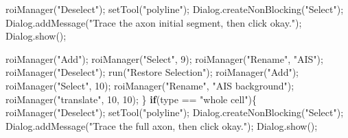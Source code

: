 \documentclass[
  12pt,
  a4paper,
]{book}
\newenvironment{Shaded}{}{}
\newcommand{\ControlFlowTok}[1]{\textcolor[rgb]{0.00,0.44,0.13}{\textbf{#1}}}
\newcommand{\DecValTok}[1]{\textcolor[rgb]{0.25,0.63,0.44}{#1}}
\newcommand{\NormalTok}[1]{#1}
\newcommand{\OperatorTok}[1]{\textcolor[rgb]{0.40,0.40,0.40}{#1}}
\newcommand{\StringTok}[1]{\textcolor[rgb]{0.25,0.44,0.63}{#1}}
\begin{document}
\begin{Shaded}
\begin{Highlighting}[]
\NormalTok{    roiManager}\OperatorTok{(}\StringTok{"Deselect"}\OperatorTok{);}
\NormalTok{    setTool}\OperatorTok{(}\StringTok{"polyline"}\OperatorTok{);}
\NormalTok{    Dialog}\OperatorTok{.}\NormalTok{createNonBlocking}\OperatorTok{(}\StringTok{"Select"}\OperatorTok{);}
\NormalTok{    Dialog}\OperatorTok{.}\NormalTok{addMessage}\OperatorTok{(}\StringTok{"Trace the axon initial segment, then click \textquotesingle{}okay\textquotesingle{}."}\OperatorTok{);}
\NormalTok{    Dialog}\OperatorTok{.}\NormalTok{show}\OperatorTok{();}

\NormalTok{    roiManager}\OperatorTok{(}\StringTok{"Add"}\OperatorTok{);}
\NormalTok{    roiManager}\OperatorTok{(}\StringTok{"Select"}\OperatorTok{,} \DecValTok{9}\OperatorTok{);}
\NormalTok{    roiManager}\OperatorTok{(}\StringTok{"Rename"}\OperatorTok{,} \StringTok{"AIS"}\OperatorTok{);}
\NormalTok{    roiManager}\OperatorTok{(}\StringTok{"Deselect"}\OperatorTok{);}
\NormalTok{    run}\OperatorTok{(}\StringTok{"Restore Selection"}\OperatorTok{);}
\NormalTok{    roiManager}\OperatorTok{(}\StringTok{"Add"}\OperatorTok{);}
\NormalTok{    roiManager}\OperatorTok{(}\StringTok{"Select"}\OperatorTok{,} \DecValTok{10}\OperatorTok{);}
\NormalTok{    roiManager}\OperatorTok{(}\StringTok{"Rename"}\OperatorTok{,} \StringTok{"AIS background"}\OperatorTok{);}
\NormalTok{    roiManager}\OperatorTok{(}\StringTok{"translate"}\OperatorTok{,} \DecValTok{10}\OperatorTok{,} \DecValTok{10}\OperatorTok{);}
\OperatorTok{\}}
\ControlFlowTok{if}\OperatorTok{(}\NormalTok{type }\OperatorTok{==} \StringTok{"whole cell"}\OperatorTok{)\{}
\NormalTok{    roiManager}\OperatorTok{(}\StringTok{"Deselect"}\OperatorTok{);}
\NormalTok{    setTool}\OperatorTok{(}\StringTok{"polyline"}\OperatorTok{);}
\NormalTok{    Dialog}\OperatorTok{.}\NormalTok{createNonBlocking}\OperatorTok{(}\StringTok{"Select"}\OperatorTok{);}
\NormalTok{    Dialog}\OperatorTok{.}\NormalTok{addMessage}\OperatorTok{(}\StringTok{"Trace the full axon, then click \textquotesingle{}okay\textquotesingle{}."}\OperatorTok{);}
\NormalTok{    Dialog}\OperatorTok{.}\NormalTok{show}\OperatorTok{();}


\end{Highlighting}
\end{Shaded}
\end{document}
